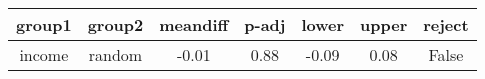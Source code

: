\begin{tabular}{|c|c|c|c|c|c|c|}
\toprule
 group1 &  group2 &  meandiff &  p-adj &  lower &  upper &  reject \\
\midrule
 income &  random &     -0.01 &   0.88 &  -0.09 &   0.08 &   False \\
\bottomrule
\end{tabular}
